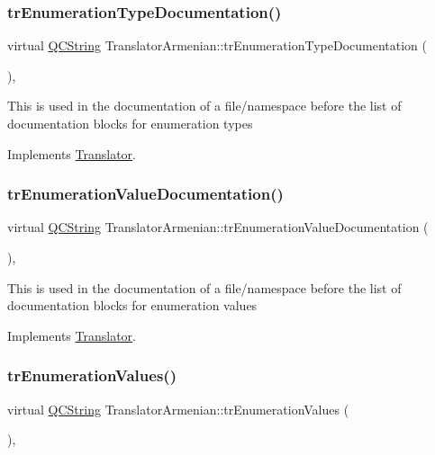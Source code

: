 \subsubsection{\texorpdfstring{trEnumerationTypeDocumentation()}{trEnumerationTypeDocumentation()}}
{\footnotesize\ttfamily virtual \mbox{\hyperlink{class_q_c_string}{Q\+C\+String}} Translator\+Armenian\+::tr\+Enumeration\+Type\+Documentation (\begin{DoxyParamCaption}{ }\end{DoxyParamCaption})\hspace{0.3cm}{\ttfamily [inline]}, {\ttfamily [virtual]}}

This is used in the documentation of a file/namespace before the list of documentation blocks for enumeration types 

Implements \mbox{\hyperlink{class_translator}{Translator}}.

\mbox{\label{class_translator_armenian_ac5be6c6240d79e2b4a83a7ada95e2f19}} 
\subsubsection{\texorpdfstring{trEnumerationValueDocumentation()}{trEnumerationValueDocumentation()}}
{\footnotesize\ttfamily virtual \mbox{\hyperlink{class_q_c_string}{Q\+C\+String}} Translator\+Armenian\+::tr\+Enumeration\+Value\+Documentation (\begin{DoxyParamCaption}{ }\end{DoxyParamCaption})\hspace{0.3cm}{\ttfamily [inline]}, {\ttfamily [virtual]}}

This is used in the documentation of a file/namespace before the list of documentation blocks for enumeration values 

Implements \mbox{\hyperlink{class_translator}{Translator}}.

\mbox{\label{class_translator_armenian_a14f559c4afb9f4c571807c9ca1fa25e2}} 
\subsubsection{\texorpdfstring{trEnumerationValues()}{trEnumerationValues()}}
{\footnotesize\ttfamily virtual \mbox{\hyperlink{class_q_c_string}{Q\+C\+String}} Translator\+Armenian\+::tr\+Enumeration\+Values (\begin{DoxyParamCaption}{ }\end{DoxyParamCaption})\hspace{0.3cm}{\ttfamily [inline]}, {\ttfamily [virtual]}}

